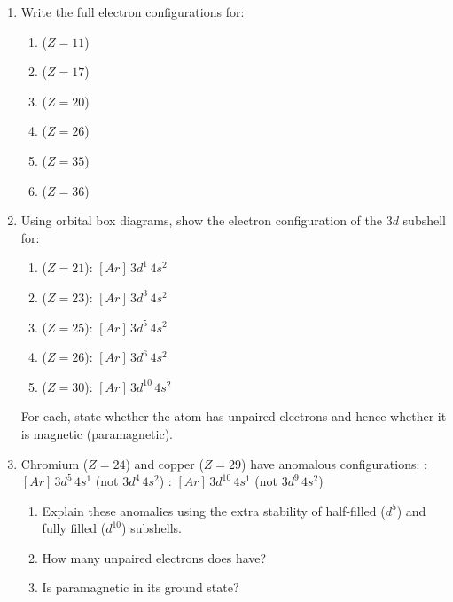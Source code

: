 \documentclass[12pt, a4paper]{book}
\begin{document}
\begin{problembox}
\begin{enumerate}[label=\textbf{\arabic*.}]
  \item Write the full electron configurations for:
        \begin{enumerate}[label=(\alph*)]
          \item {} ($Z=11$)
          \item {} ($Z=17$)
          \item {} ($Z=20$)
          \item {} ($Z=26$)
          \item {} ($Z=35$)
          \item {} ($Z=36$)
        \end{enumerate}

  \item Using orbital box diagrams, show the electron
        configuration of the $3d$ subshell for:
        \begin{enumerate}[label=(\alph*)]
          \item {} ($Z=21$): $[Ar]\,3d^1\,4s^2$
          \item {} ($Z=23$): $[Ar]\,3d^3\,4s^2$
          \item {} ($Z=25$): $[Ar]\,3d^5\,4s^2$
          \item {} ($Z=26$): $[Ar]\,3d^6\,4s^2$
          \item {} ($Z=30$): $[Ar]\,3d^{10}\,4s^2$
        \end{enumerate}
        For each, state whether the atom has unpaired electrons
        and hence whether it is magnetic (paramagnetic).

  \item Chromium ($Z=24$) and copper ($Z=29$) have anomalous
        configurations:
        : $[Ar]\,3d^5\,4s^1$ (not $3d^4\,4s^2$)
        : $[Ar]\,3d^{10}\,4s^1$ (not $3d^9\,4s^2$)
        \begin{enumerate}[label=(\alph*)]
          \item Explain these anomalies using the
                extra stability of half-filled ($d^5$)
                and fully filled ($d^{10}$) subshells.
          \item How many unpaired electrons does  have?
          \item Is  paramagnetic in its ground state?
        \end{enumerate}
\end{enumerate}
\end{problembox}
\end{document}
